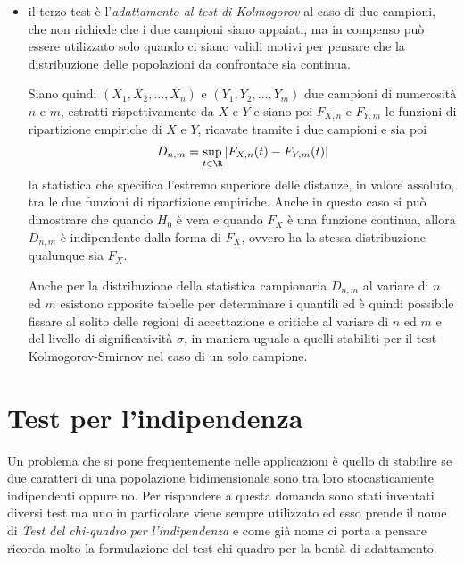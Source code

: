 \begin{itemize}
    \item il terzo test è l'\emph{adattamento al test di Kolmogorov} al caso di due campioni, che non richiede che 
          i due campioni siano appaiati, ma in compenso può essere utilizzato solo quando ci siano validi motivi per
          pensare che la distribuzione delle popolazioni da confrontare sia continua.

          Siano quindi $(X_1, X_2, \dots, X_n)$ e $(Y_1, Y_2, \dots, Y_m)$ due campioni di numerosità $n$ e $m$,
          estratti rispettivamente da $X$ e $Y$ e siano poi $F_{X, n}$ e $F_{Y, m}$ le funzioni di ripartizione
          empiriche di $X$ e $Y$, ricavate tramite i due campioni e sia poi
          \[ D_{n, m} = \sup _{t \in \R} |F_{X, n}(t) - F_{Y, m}(t)| \]
          la statistica che specifica l'estremo superiore delle distanze, in valore assoluto, tra le due funzioni
          di ripartizione empiriche.\newline
          Anche in questo caso si può dimostrare che quando $H_0$ è vera e quando $F_X$ è una funzione continua,
          allora $D _{n, m}$ è indipendente dalla forma di $F_X$, ovvero ha la stessa distribuzione qualunque sia $F_X$.

          Anche per la distribuzione della statistica campionaria $D _{n, m}$ al variare di $n$ ed $m$ esistono 
          apposite tabelle per determinare i quantili ed è quindi possibile fissare al solito delle regioni di
          accettazione e critiche al variare di $n$ ed $m$ e del livello di significatività $\sigma$, in maniera uguale
          a quelli stabiliti per il test Kolmogorov-Smirnov nel caso di un solo campione.
\end{itemize}

\section{Test per l'indipendenza}
Un problema che si pone frequentemente nelle applicazioni è quello di stabilire se due caratteri di una popolazione
bidimensionale sono tra loro stocasticamente indipendenti oppure no.\newline
Per rispondere a questa domanda sono stati inventati diversi test ma uno in particolare viene sempre utilizzato ed
esso prende il nome di \emph{Test del chi-quadro per l'indipendenza} e come già nome ci porta a pensare ricorda molto la
formulazione del test chi-quadro per la bontà di adattamento.

